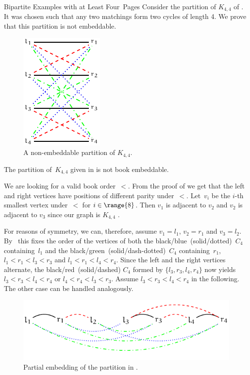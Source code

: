 \begin{subsection}{Bipartite Examples with at Least Four~Pages}
Consider the partition of $K_{4,4}$ of .
It was chosen such that any two matchings form two cycles of length 4. We prove
that this partition is not embeddable.

\begin{figure}[\placement]\centering
    \includegraphics{figures/t_split_k4}
    \caption[$K_{4,4}$ has a non-embeddable partition]{A non-embeddable partition of $K_{4,4}$.}
    \label{figure:split_k4}
\end{figure}

\begin{lemma}
\label{lemma:split_k4}
The partition of~$K_{4,4}$ given in  is not book
embeddable.
\end{lemma}
\begin{myproof}
We are looking for a valid book order~$<$. From the proof of 
we get that the left and right vertices have positions of different parity under~$<$.
Let~$v_i$ be the $i$-th smallest vertex under~$<$ for $i \in \range{8}$. Then $v_1$ is adjacent to $v_2$ and $v_2$ is adjacent to $v_3$ since our graph is $K_{4,4}$ .

For reasons of symmetry, we can, therefore, assume $v_1 = l_1$, $v_2 = r_1$ and $v_3 = l_2$.
By~ this fixes the order of the vertices of both the black/blue~(solid/dotted)~$C_4$ containing~$l_1$ and the black/green~(solid/dash-dotted)~$C_4$ containing~$r_1$, \ie $l_1 < r_1 < l_3 < r_3$ and $l_1 < r_1 < l_4 < r_4$.
Since the left and the right vertices alternate, the black/red~(solid/dashed) $C_4$ formed by $\{l_3, r_3, l_4, r_4\}$ now yields $l_3 < r_3 < l_4 < r_4$ or $l_4 < r_4 < l_3 < r_3$. Assume $l_3 < r_3 < l_4 < r_4$
in the following. The other case can be handled analogously. 

\begin{figure}[\placement]\centering
    \includegraphics{figures/t_not_embeddable}
    \caption{Partial embedding of the partition in .}
    \label{figure:partial_k4}
\end{figure}


\end{myproof}
\end{subsection}
